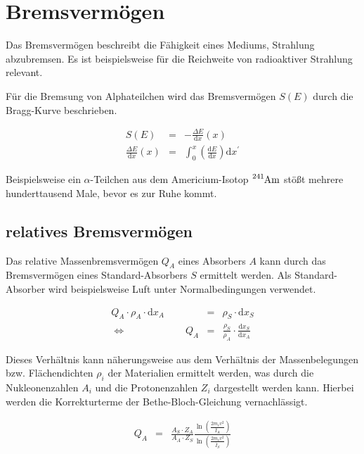 \documentclass[12pt,a4paper]{scrartcl}
\numberwithin{equation}{section} %
\renewcommand{\[}{} %
\renewcommand{\]}{\noindent} %
\begin{document}
\hypertarget{bremsvermuxf6gen}{%
\section{Bremsvermögen}\label{bremsvermuxf6gen}}

Das Bremsvermögen beschreibt die Fähigkeit eines Mediums, Strahlung
abzubremsen. Es ist beispielsweise für die Reichweite von radioaktiver
Strahlung relevant.

Für die Bremsung von Alphateilchen wird das Bremsvermögen \(S(E)\) durch
die Bragg-Kurve beschrieben.

\[
\begin{eqnarray}
    S(E) &=& - \frac{\Delta E}{\mathrm dx}(x) \\
        \frac{\Delta E}{\mathrm dx}(x) &=&
                \int_0^x \left(\frac{\mathrm dE}{\mathrm dx}\right) \mathrm dx^\prime
\end{eqnarray}
\]

Beispielsweise ein \(\alpha\)-Teilchen aus dem Americium-Isotop
\(\ce{^{241}Am}\) stößt mehrere hunderttausend Male, bevor es zur Ruhe
kommt.

\hypertarget{relatives-bremsvermuxf6gen}{%
\subsection{relatives Bremsvermögen}\label{relatives-bremsvermuxf6gen}}

Das relative Massenbremsvermögen \(Q_A\) eines Absorbers \(A\) kann
durch das Bremsvermögen eines Standard-Absorbers \(S\) ermittelt werden.
Als Standard-Absorber wird beispielsweise Luft unter Normalbedingungen
verwendet.

\[
\begin{eqnarray}
        Q_A \cdot \rho_A \cdot \mathrm dx_A
                &=& \rho_S \cdot \mathrm dx_S \\
        \Leftrightarrow \qquad\qquad\qquad Q_A
                &=& \frac{\rho_S}{\rho_A}
                        \cdot \frac{\mathrm dx_S}{\mathrm dx_A}
\end{eqnarray}
\]

Dieses Verhältnis kann näherungsweise aus dem Verhältnis der
Massenbelegungen bzw. Flächendichten \(\rho_i\) der Materialien
ermittelt werden, was durch die Nukleonenzahlen \(A_i\) und die
Protonenzahlen \(Z_i\) dargestellt werden kann. Hierbei werden die
Korrekturterme der Bethe-Bloch-Gleichung vernachlässigt.

\[
\begin{eqnarray}
        Q_A &=& \frac{A_S\cdot Z_A}{A_A\cdot Z_S}
                \frac{\ln\left(\frac{2m_ev^2}{\bar I_A}\right)}{\ln\left(\frac{2m_ev^2}{\bar I_S}\right)}
\end{eqnarray}
\]
\end{document}
